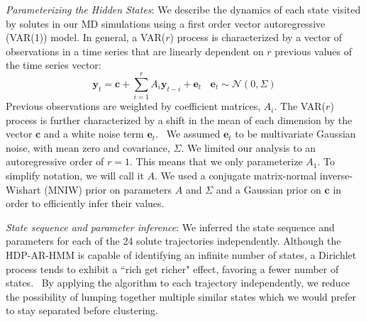 \documentclass[journal=jpcbfk,manuscript=article]{achemso}
\begin{document}
  \textit{Parameterizing the Hidden States}: We describe the dynamics of each 
  state visited by solutes in our MD simulations using a first order vector 
  autoregressive (VAR(1)) model. In general, a VAR($r$) process is characterized by a
  vector of observations in a time series that are linearly dependent on $r$ previous
  values of the time series vector:
  \begin{equation}
  	\mathbf{y}_t = \mathbf{c} + \sum_{i=1}^r A_i\mathbf{y}_{t-i} + \mathbf{e}_t~~~~\mathbf{e}_t \sim \mathcal{N}(0, \Sigma)
  \label{eqn:var}
  \end{equation}
  Previous observations are weighted by coefficient matrices, $A_i$. The VAR($r$) 
  process is further characterized by a shift in the mean of each dimension by the
  vector $\mathbf{c}$ and a white noise term $\mathbf{e}_t$.~\cite{hamilton_time_1994}
  We assumed $\mathbf{e}_t$ to be multivariate Gaussian noise, with mean zero and
  covariance, $\Sigma$. We limited our analysis to an autoregressive order of $r=1$.
  This means that we only parameterize $A_1$. To simplify notation, we will call it $A$. 
  We used a conjugate matrix-normal inverse-Wishart (MNIW) prior on parameters 
  $A$ and $\Sigma$ and a Gaussian prior on $\mathbf{c}$ in order to efficiently infer their 
  values.~\cite{fox_nonparametric_2009}
   
  
  \textit{State sequence and parameter inference}: We inferred the 
  state sequence and parameters for each of the 24 solute trajectories independently.
  Although the HDP-AR-HMM is capable of identifying an infinite number of states, 
  a Dirichlet process tends to exhibit a ``rich get richer" effect, favoring
  a fewer number of states.~\cite{dreyer_discovering_2011} By applying the algorithm to each trajectory 
  independently, we reduce the possibility of lumping together multiple 
  similar states which we would prefer to stay separated before clustering.
  
\end{document}
